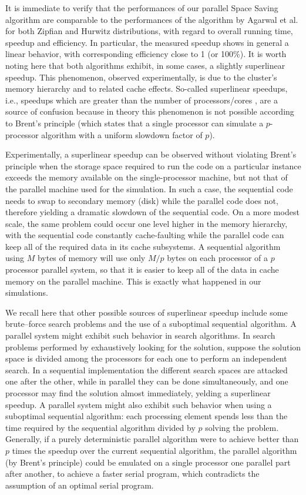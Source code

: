 \documentclass[final,3p,times]{elsarticle}
\begin{document}
It is immediate to verify that the performances of our parallel Space Saving algorithm are comparable to the performances of the algorithm by Agarwal et al. for both Zipfian and Hurwitz distributions, with regard to overall running time, speedup and efficiency. In particular, the measured speedup shows in general a linear behavior, with corresponding efficiency close to 1 (or 100\%). It is worth noting here that both algorithms exhibit, in some cases, a slightly superlinear speedup. This phenomenon, observed experimentally, is due to the cluster's memory hierarchy and to related cache effects. So-called superlinear speedups, i.e., speedups which are greater than the number of processors/cores \cite{Bader}, are a source of confusion because in theory this phenomenon is not possible according to  Brent's principle \cite{brent74} (which states that a single processor can simulate a $p$-processor algorithm with a uniform slowdown factor of $p$).

Experimentally, a superlinear  speedup can be observed without violating Brent's principle when the storage space required to run the code on a particular instance exceeds the
memory available on the single-processor machine, but not that of the parallel machine used for the simulation. In such a case, the sequential code needs to swap to secondary
memory (disk) while the parallel code does not, therefore yielding a dramatic slowdown of the sequential code. On a more modest scale, the same problem could occur one level
higher in the memory hierarchy, with the sequential code constantly cache-faulting while the parallel code can keep all of the required data in its cache subsystems. A
sequential algorithm using $M$ bytes of memory will use only $M/p$ bytes on each processor of a $p$ processor parallel system, so that it is easier to keep all of the data in
cache memory on the parallel machine. This is exactly what happened in our simulations.

We recall here that other possible sources of superlinear speedup include some brute--force search problems and the use of a suboptimal sequential algorithm. A parallel system
might exhibit such behavior in search algorithms. In search problems performed by exhaustively looking for the solution, suppose the solution space is divided among the
processors for each one to perform an independent search. In a sequential  implementation the different search spaces are attacked one after the other, while in parallel they
can be done simultaneously, and one processor may find the solution almost immediately, yelding a superlinear speedup.
A parallel system might also exhibit such behavior when using a suboptimal sequential algorithm: each processing element spends less than the time required by the sequential
algorithm divided by  $p$ solving the problem. Generally, if a purely deterministic parallel algorithm were to achieve  better than $p$ times the speedup over the current
sequential algorithm, the parallel algorithm (by Brent's principle) could be emulated on a single processor one parallel part after another, to achieve a faster serial program,
which contradicts the assumption of an optimal serial program.
\end{document}

